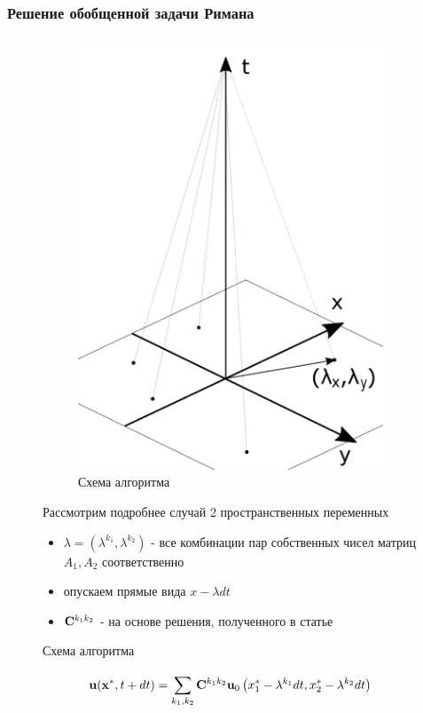 \documentclass[unicode,aspectratio=43]{beamer}
\begin{document}
\begin{frame}\frametitle{Решение обобщенной задачи Римана}
	\begin{figure}[ht!]
		\centering
		\begin{minipage}{0.5\textwidth}
	\begin{figure}[ht!]
		\centering
		\includegraphics[scale=0.14]{algr}
		\captionsetup{labelformat=empty}
		\caption{Схема алгоритма}
	\end{figure}
		\end{minipage}
		\hfill
		\begin{minipage}{0.49\textwidth}
			Рассмотрим подробнее случай 2 пространственных переменных
	\begin{itemize}
		\item $\lambda = ({\lambda } ^{k_1}, {\lambda } ^{k_2})$ - все комбинации пар собственных чисел матриц $A_1, A_2$ соответственно
		\item опускаем прямые вида $x - \lambda dt$
		\item ${\bf{C}}^{k_1 k_2}$ - на основе решения, полученного в статье
	\end{itemize}
		\end{minipage}
	\end{figure}
	\begin{equation*}
	{{\bf{u}} ({\bf{x^*}}, t + dt)}
	= 
	\sum\limits_{k_1, k_2}^{} {{\bf{C}}^{k_1 k_2}{\bf{u}}_0 \left( { {x^*_1}- {\bf{\lambda }} ^{{k_1}}dt,{x^*_2} - {\bf{\lambda }} ^{{k_2}}dt} \right)}
	\end{equation*}
\end{frame}	
\end{document}
